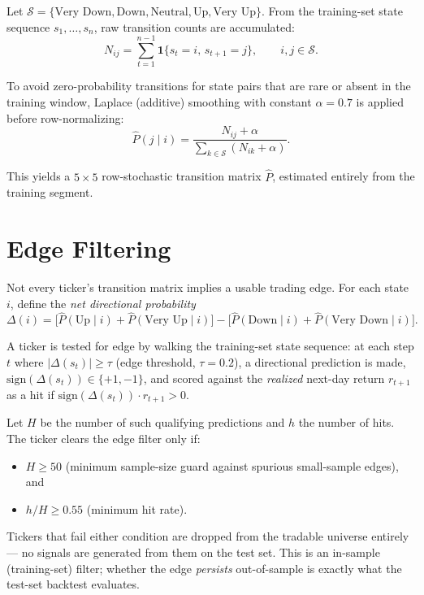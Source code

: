 \documentclass[11pt]{article}
\begin{document}
Let $\mathcal{S} = \{\text{Very Down}, \text{Down}, \text{Neutral},
\text{Up}, \text{Very Up}\}$. From the training-set state sequence
$s_1, \dots, s_n$, raw transition counts are accumulated:
\[
  N_{ij} = \sum_{t=1}^{n-1} \mathbf{1}\{s_t = i,\, s_{t+1} = j\}, \qquad i, j \in \mathcal{S}.
\]

To avoid zero-probability transitions for state pairs that are rare or
absent in the training window, Laplace (additive) smoothing with constant
$\alpha = 0.7$ is applied before row-normalizing:
\[
  \hat{P}(j \mid i) = \frac{N_{ij} + \alpha}{\sum_{k \in \mathcal{S}} (N_{ik} + \alpha)}.
\]

This yields a $5 \times 5$ row-stochastic transition matrix $\hat{P}$,
estimated entirely from the training segment.

\section{Edge Filtering}

Not every ticker's transition matrix implies a usable trading edge. For
each state $i$, define the \emph{net directional probability}
\[
  \Delta(i) = \big[\hat P(\text{Up}\mid i) + \hat P(\text{Very Up}\mid i)\big]
            - \big[\hat P(\text{Down}\mid i) + \hat P(\text{Very Down}\mid i)\big].
\]

A ticker is tested for edge by walking the training-set state sequence: at
each step $t$ where $|\Delta(s_t)| \ge \tau$ (edge threshold, $\tau = 0.2$),
a directional prediction is made,
$\text{sign}(\Delta(s_t)) \in \{+1, -1\}$, and scored against the
\emph{realized} next-day return $r_{t+1}$ as a hit if
$\text{sign}(\Delta(s_t)) \cdot r_{t+1} > 0$.

Let $H$ be the number of such qualifying predictions and $h$ the number of
hits. The ticker clears the edge filter only if:
\begin{itemize}[nosep]
  \item $H \ge 50$ (minimum sample-size guard against spurious small-sample edges), and
  \item $h / H \ge 0.55$ (minimum hit rate).
\end{itemize}

Tickers that fail either condition are dropped from the tradable universe
entirely — no signals are generated from them on the test set. This is an
in-sample (training-set) filter; whether the edge \emph{persists}
out-of-sample is exactly what the test-set backtest evaluates.
\end{document}
